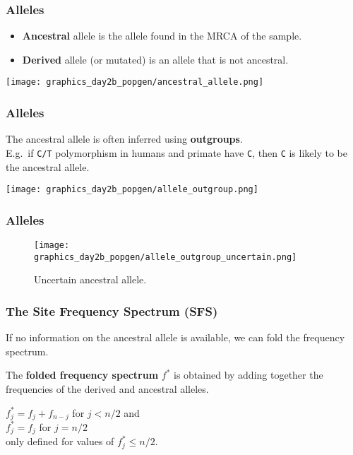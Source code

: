 \documentclass{beamer}
\newcommand{\1}{\ensuremath{\mathbf{1}}}
\begin{document}
%
%
%
\begin{frame}\frametitle{Alleles}
	\begin{itemize}
		\item \textbf{Ancestral} allele is the allele found in the MRCA of the sample.
		\item \textbf{Derived} allele (or mutated) is an allele that is not ancestral.
	\end{itemize}
	\begin{center}
		\texttt{[image: graphics\_day2b\_popgen/ancestral\_allele.png]}
	\end{center}
\end{frame}
%
%
%
\begin{frame}\frametitle{Alleles}
	The ancestral allele is often inferred using \textbf{outgroups}.\\
	E.g.\ if \texttt{C/T} polymorphism in humans and primate have \texttt{C}, then \texttt{C} is likely to be the ancestral allele.
	\begin{center}
		\texttt{[image: graphics\_day2b\_popgen/allele\_outgroup.png]}
	\end{center}
\end{frame}
%
%
%
\begin{frame}\frametitle{Alleles}
	\begin{figure}
	\begin{center}
		\texttt{[image: graphics\_day2b\_popgen/allele\_outgroup\_uncertain.png]}
	\end{center}
	\caption{Uncertain ancestral allele.}
	\end{figure}
\end{frame}
%
%
%
\begin{frame}\frametitle{The Site Frequency Spectrum (SFS)}
	If no information on the ancestral allele is available, we can fold the frequency spectrum.
	\begin{block}{}
		The \textbf{folded frequency spectrum} $f^*$ is obtained by adding together the frequencies of the derived and ancestral alleles.
	\end{block}
	$f^*_j = f_j+f_{n-j}$ for $j<n/2$ and\\
	$f^*_j = f_j$ for $j=n/2$\\
	only defined for values of $f^*_j \leq n/2$.
\end{frame}
\end{document}

